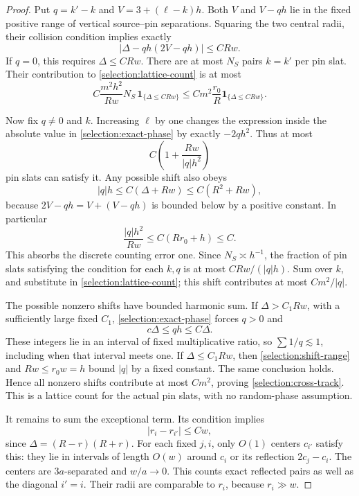\begin{proof}
Put \(q=k'-k\) and \(V=3+(\ell-k)h\). Both \(V\) and
\(V-qh\) lie in the fixed positive range of vertical source--pin
separations. Squaring the two central radii, their collision condition
implies exactly
\begin{equation}\label{selection:exact-phase}
 \big|\Delta-qh(2V-qh)\big|\le CRw.
\end{equation}
If \(q=0\), this requires \(\Delta\le CRw\). There are at most
\(N_S\) pairs \(k=k'\) per pin slat. Their contribution to
\eqref{selection:lattice-count} is at most
\[
 C\frac{m^2h^2}{Rw}N_S\,
       \mathbf1_{\{\Delta\le CRw\}}
 \le Cm^2\frac{r_0}{R}\mathbf1_{\{\Delta\le CRw\}}.
\]

Now fix \(q\ne0\) and \(k\). Increasing \(\ell\) by one
changes the expression inside the absolute value in
\eqref{selection:exact-phase} by exactly \(-2qh^2\). Thus at most
\[
 C\left(1+\frac{Rw}{|q|h^2}\right)
\]
pin slats can satisfy it. Any possible shift also obeys
\begin{equation}\label{selection:shift-range}
 |q|h\le C(\Delta+Rw)\le C(R^2+Rw),
\end{equation}
because \(2V-qh=V+(V-qh)\) is bounded below by a positive constant.
In particular
\[
 \frac{|q|h^2}{Rw}\le C(Rr_0+h)\le C.
\]
This absorbs the discrete counting error one. Since \(N_S\asymp h^{-1}\),
the fraction of pin slats satisfying the condition for each \(k,q\)
is at most \(CRw/(|q|h)\). Sum over \(k\), and substitute in
\eqref{selection:lattice-count}; this shift contributes at most
\(Cm^2/|q|\).

The possible nonzero shifts have bounded harmonic sum. If
\(\Delta>C_1Rw\), with a sufficiently large fixed \(C_1\),
\eqref{selection:exact-phase} forces \(q>0\) and
\[
 c\Delta\le qh\le C\Delta.
\]
These integers lie in an interval of fixed multiplicative ratio, so
\(\sum 1/q\lesssim1\), including when that interval meets one.
If \(\Delta\le C_1Rw\), then \eqref{selection:shift-range} and
\(Rw\le r_0w=h\) bound \(|q|\) by a fixed constant. The same
conclusion holds. Hence all nonzero shifts contribute at most \(Cm^2\),
proving \eqref{selection:cross-track}. This is a lattice count for the
actual pin slats, with no random-phase assumption.

It remains to sum the exceptional term. Its condition implies
\[
 |r_i-r_{i'}|\le Cw,
\]
since \(\Delta=(R-r)(R+r)\). For each fixed \(j,i\), only
\(O(1)\) centers \(c_{i'}\) satisfy this: they lie in intervals
of length \(O(w)\) around \(c_i\) or its reflection
\(2c_j-c_i\). The centers are \(3a\)-separated and \(w/a\to0\).
This counts exact reflected pairs as well as the diagonal \(i'=i\).
Their radii are comparable to \(r_i\), because \(r_i\gg w\).


\end{proof}
